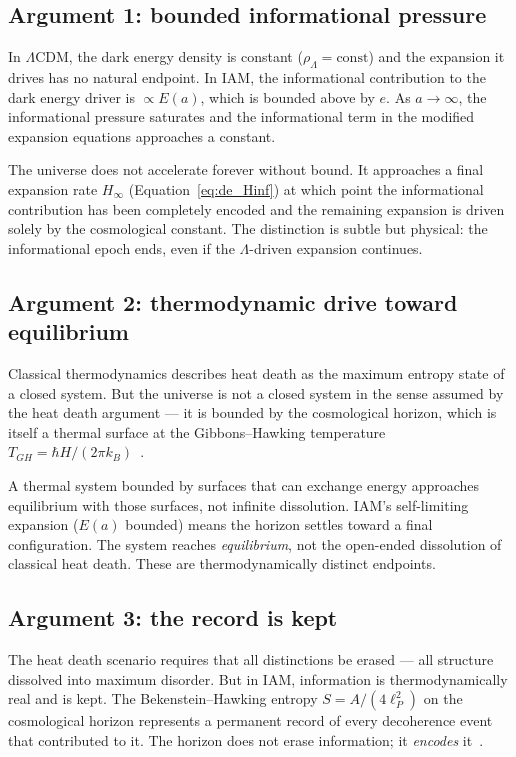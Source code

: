 \subsection{Argument 1: bounded informational pressure}
In $\Lambda$CDM, the dark energy density is constant ($\rho_\Lambda=\mathrm{const}$) and the expansion it drives has no natural endpoint. In IAM,
the informational contribution to the dark energy driver is $\propto E(a)$, which is bounded above by $e$. As $a\to\infty$, the informational
pressure saturates and the informational term in the modified expansion equations approaches a constant.

The universe does not accelerate forever without bound. It approaches a final expansion rate $H_\infty$ (Equation~\eqref{eq:de_Hinf}) at which point
the informational contribution has been completely encoded and the remaining expansion is driven solely by the cosmological constant. The
distinction is subtle but physical: the informational epoch ends, even if the $\Lambda$-driven expansion continues. \interp

\subsection{Argument 2: thermodynamic drive toward equilibrium}
Classical thermodynamics describes heat death as the maximum entropy state of a closed system. But the universe is not a closed system in the
sense assumed by the heat death argument --- it is bounded by the cosmological horizon, which is itself a thermal surface at the Gibbons--Hawking
temperature $T_{GH}=\hbar H/(2\pi k_B)$~\cite{GibbonsHawking1977}.

A thermal system bounded by surfaces that can exchange energy approaches equilibrium with those surfaces, not infinite dissolution. IAM's
self-limiting expansion ($E(a)$ bounded) means the horizon settles toward a final configuration. The system reaches \emph{equilibrium}, not the
open-ended dissolution of classical heat death. These are thermodynamically distinct endpoints. \interp

\subsection{Argument 3: the record is kept}
The heat death scenario requires that all distinctions be erased --- all structure dissolved into maximum disorder. But in IAM, information is
thermodynamically real and is kept. The Bekenstein--Hawking entropy $S=A/(4\ell_P^2)$ on the cosmological horizon represents a permanent record of
every decoherence event that contributed to it. The horizon does not erase information; it \emph{encodes} it~\cite{Bekenstein1973,Hawking1975}.

